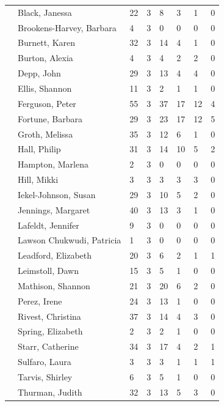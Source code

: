\documentclass{article}\usepackage[]{graphicx}\usepackage[]{color}
\begin{document}
{\begin{longtable} { >{\raggedright}p{}p{}p{}p{}p{}p{}p{}p{}}
   \rowcolor[gray]{0.90} & Black, Janessa & 22 & 3 & 8 & 3 & 1 & 0 \\ 
   & Brookens-Harvey, Barbara & 4 & 3 & 0 & 0 & 0 & 0 \\ 
   & Burnett, Karen & 32 & 3 & 14 & 4 & 1 & 0 \\ 
   & Burton, Alexia & 4 & 3 & 4 & 2 & 2 & 0 \\ 
   \rowcolor[gray]{0.90} & Depp, John & 29 & 3 & 13 & 4 & 4 & 0 \\ 
   \rowcolor[gray]{0.90} & Ellis, Shannon & 11 & 3 & 2 & 1 & 1 & 0 \\ 
   \rowcolor[gray]{0.90} & Ferguson, Peter & 55 & 3 & 37 & 17 & 12 & 4 \\ 
   & Fortune, Barbara & 29 & 3 & 23 & 17 & 12 & 5 \\ 
   & Groth, Melissa & 35 & 3 & 12 & 6 & 1 & 0 \\ 
   & Hall, Philip & 31 & 3 & 14 & 10 & 5 & 2 \\ 
   \rowcolor[gray]{0.90} & Hampton, Marlena & 2 & 3 & 0 & 0 & 0 & 0 \\ 
   \rowcolor[gray]{0.90} & Hill, Mikki & 3 & 3 & 3 & 3 & 3 & 0 \\ 
   \rowcolor[gray]{0.90} & Iekel-Johnson, Susan & 29 & 3 & 10 & 5 & 2 & 0 \\ 
   & Jennings, Margaret & 40 & 3 & 13 & 3 & 1 & 0 \\ 
   & Lafeldt, Jennifer & 9 & 3 & 0 & 0 & 0 & 0 \\ 
   & Lawson Chukwudi, Patricia & 1 & 3 & 0 & 0 & 0 & 0 \\ 
   \rowcolor[gray]{0.90} & Leadford, Elizabeth & 20 & 3 & 6 & 2 & 1 & 1 \\ 
   \rowcolor[gray]{0.90} & Leimstoll, Dawn & 15 & 3 & 5 & 1 & 0 & 0 \\ 
   \rowcolor[gray]{0.90} & Mathison, Shannon & 21 & 3 & 20 & 6 & 2 & 0 \\ 
   & Perez, Irene & 24 & 3 & 13 & 1 & 0 & 0 \\ 
   & Rivest, Christina & 37 & 3 & 14 & 4 & 3 & 0 \\ 
   & Spring, Elizabeth & 2 & 3 & 2 & 1 & 0 & 0 \\ 
   \rowcolor[gray]{0.90} & Starr, Catherine & 34 & 3 & 17 & 4 & 2 & 1 \\ 
   \rowcolor[gray]{0.90} & Sulfaro, Laura & 3 & 3 & 3 & 1 & 1 & 1 \\ 
   \rowcolor[gray]{0.90} & Tarvis, Shirley & 6 & 3 & 5 & 1 & 0 & 0 \\ 
   & Thurman, Judith & 32 & 3 & 13 & 5 & 3 & 0 \\ 

\end{longtable}}
\end{document}
